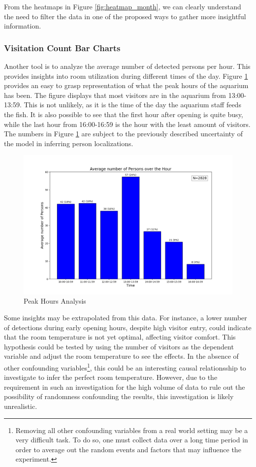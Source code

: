 From the heatmaps in Figure \ref{fig:heatmap_month}, we can clearly understand the need to filter the data in one of the proposed ways to gather more insightful information. 

\subsubsection{Visitation Count Bar Charts}
\label{sec:peak_hours}
Another tool is to analyze the average number of detected persons per hour. This provides insights into room utilization during different times of the day. Figure \ref{fig:peak_hours} provides an easy to grasp representation of what the peak hours of the aquarium has been. The figure displays that most visitors are in the aquarium from 13:00-13:59. This is not unlikely, as it is the time of the day the aquarium staff feeds the fish. It is also possible to see that the first hour after opening is quite busy, while the last hour from 16:00-16:59 is the hour with the least amount of visitors. The numbers in Figure \ref{fig:peak_hours} are subject to the previously described uncertainty of the model in inferring person localizations.

\begin{figure}[H]
	\centering
	\includegraphics[width=1\textwidth]{Images/Analytics/peak_hours.png}
	\caption{Peak Hours Analysis}
    \label{fig:peak_hours}
\end{figure}

Some insights may be extrapolated from this data. For instance, a lower number of detections during early opening hours, despite high visitor entry, could indicate that the room temperature is not yet optimal, affecting visitor comfort. This hypothesis could be tested by using the number of visitors as the dependent variable and adjust the room temperature to see the effects. In the absence of other confounding variables\footnote{Removing all other confounding variables from a real world setting may be a very difficult task. To do so, one must collect data over a long time period in order to average out the random events and factors that may influence the experiment.}, this could be an interesting causal relationsship to investigate to infer the perfect room temperature. However, due to the requirement in such an investigation for the high volume of data to rule out the possibility of randomness confounding the results, this investigation is likely unrealistic.

